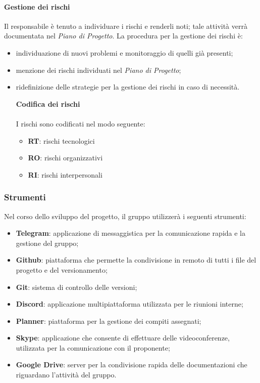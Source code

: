 \paragraph{Gestione dei rischi}
Il responsabile è tenuto a individuare i rischi e renderli noti; tale attività verrà documentata nel \textit{Piano di Progetto}. La procedura per la gestione dei rischi è: 
\begin{itemize}
\item individuazione di nuovi problemi e monitoraggio di quelli già presenti;
\item menzione dei rischi individuati nel \textit{Piano di Progetto}; 
\item ridefinizione delle strategie per la gestione dei rischi in caso di necessità.\newline \newline

\textbf{Codifica dei rischi}\mbox{}\\ \mbox{}\\
I rischi sono codificati nel modo seguente: 
\begin{itemize}
\item  \textbf{RT}: rischi tecnologici 
\item \textbf{RO}: rischi organizzativi
\item   \textbf{RI}: rischi interpersonali
\end{itemize}
\end{itemize}
\subsubsection{Strumenti}
Nel corso dello sviluppo del progetto, il gruppo utilizzerà i seguenti strumenti: 
\begin{itemize}
\item \textbf{Telegram\glo}: applicazione di messaggistica per la comunicazione rapida e la gestione del gruppo; 
\item \textbf{Github\glo}: piattaforma che permette la condivisione in remoto di tutti i file del progetto e del versionamento;
\item \textbf{Git\glo}: sistema di controllo delle versioni;
\item \textbf{Discord}: applicazione multipiattaforma utilizzata per le riunioni interne;
\item \textbf{Planner}: piattaforma per la gestione dei compiti assegnati;
\item \textbf{Skype}: applicazione che consente di effettuare delle videoconferenze, utilizzata per la comunicazione con il proponente;
\item \textbf{Google Drive}: server per la condivisione rapida delle documentazioni che riguardano l'attività del gruppo.
\end{itemize}